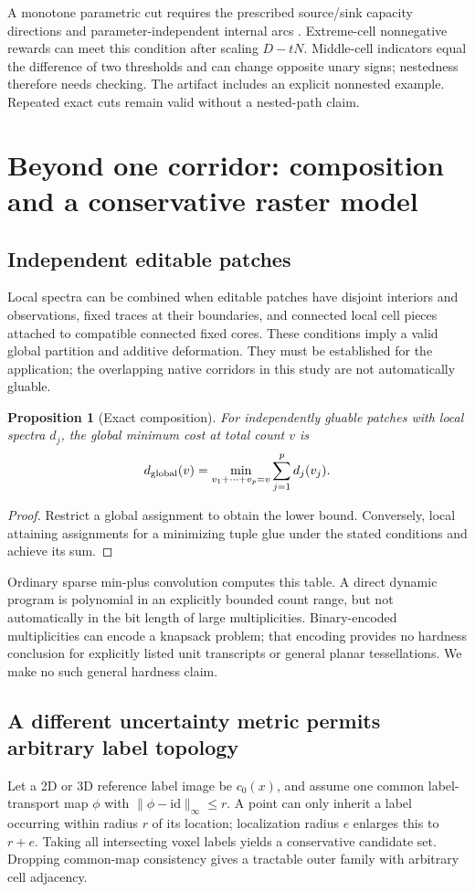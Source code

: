 \documentclass[10pt,letterpaper]{article}
\newtheorem{proposition}[theorem]{Proposition}
\begin{document}
A monotone parametric cut requires the prescribed source/sink capacity directions and parameter-independent internal arcs \cite{gallo}. Extreme-cell nonnegative rewards can meet this condition after scaling $D-tN$. Middle-cell indicators equal the difference of two thresholds and can change opposite unary signs; nestedness therefore needs checking. The artifact includes an explicit nonnested example. Repeated exact cuts remain valid without a nested-path claim.
\section{Beyond one corridor: composition and a conservative raster model}
\subsection{Independent editable patches}
Local spectra can be combined when editable patches have disjoint interiors and observations, fixed traces at their boundaries, and connected local cell pieces attached to compatible connected fixed cores. These conditions imply a valid global partition and additive deformation. They must be established for the application; the overlapping native corridors in this study are not automatically gluable.

\begin{proposition}[Exact composition]
For independently gluable patches with local spectra \(d_j\), the global minimum cost at total count \(v\) is
\[
 d_{\rm global}(v)=\min_{v_1+\cdots+v_p=v}\sum_{j=1}^p d_j(v_j).
\]
\end{proposition}
\begin{proof}
Restrict a global assignment to obtain the lower bound. Conversely, local attaining assignments for a minimizing tuple glue under the stated conditions and achieve its sum.
\end{proof}
Ordinary sparse min-plus convolution computes this table. A direct dynamic program is polynomial in an explicitly bounded count range, but not automatically in the bit length of large multiplicities. Binary-encoded multiplicities can encode a knapsack problem; that encoding provides no hardness conclusion for explicitly listed unit transcripts or general planar tessellations. We make no such general hardness claim.

\subsection{A different uncertainty metric permits arbitrary label topology}
Let a 2D or 3D reference label image be \(c_0(x)\), and assume one common label-transport map \(\phi\) with \(\|\phi-\mathrm{id}\|_\infty\leq r\). A point can only inherit a label occurring within radius \(r\) of its location; localization radius \(e\) enlarges this to \(r+e\). Taking all intersecting voxel labels yields a conservative candidate set. Dropping common-map consistency gives a tractable outer family with arbitrary cell adjacency.
\end{document}
